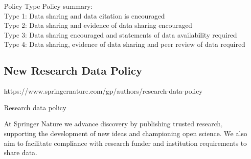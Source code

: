 \documentclass[11pt]{article}
\begin{document}
Policy Type	Policy summary:\\
Type 1: Data sharing and data citation is encouraged\\
Type 2: Data sharing and evidence of data sharing encouraged\\
Type 3: Data sharing encouraged and statements of data availability required\\
Type 4: Data sharing, evidence of data sharing and peer review of data required\\

\subsection{New Research Data Policy}
https://www.springernature.com/gp/authors/research-data-policy

Research data policy

At Springer Nature we advance discovery by publishing trusted research, supporting the development of new ideas and championing open science. We also aim to facilitate compliance with research funder and institution requirements to share data.
\end{document}
